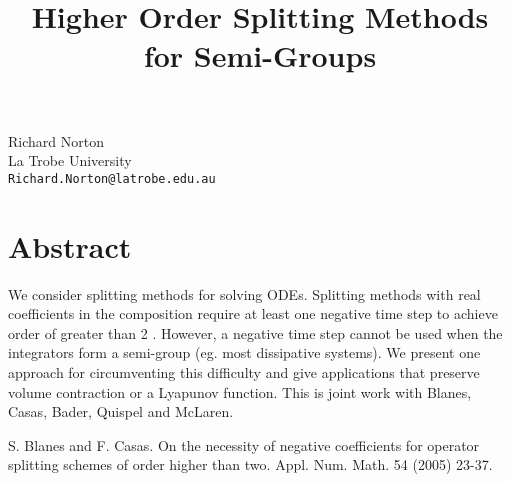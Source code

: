 \title{Higher Order Splitting Methods for Semi-Groups}
 \author{} \institute{}
\maketitle
\begin{center}
{\large Richard Norton}\\
La Trobe University\\
{\tt Richard.Norton@latrobe.edu.au}

\end{center}

\section*{Abstract}

We consider splitting methods for solving ODEs.  Splitting methods with real coefficients in the composition require at least one negative time step to achieve order of greater than 2 \cite{blanes05}.  However, a negative time step cannot be used when the integrators form a semi-group (eg. most dissipative systems).  We present one approach for circumventing this difficulty and give applications that preserve volume contraction or a Lyapunov function.  This is joint work with Blanes, Casas, Bader, Quispel and McLaren.


\begin{thebibliography}{10}

{\sc S. Blanes and F. Casas}. {On the necessity of negative coefficients for operator splitting schemes of order higher than two}. Appl. Num. Math. 54 (2005) 23-37.

\end{thebibliography}
